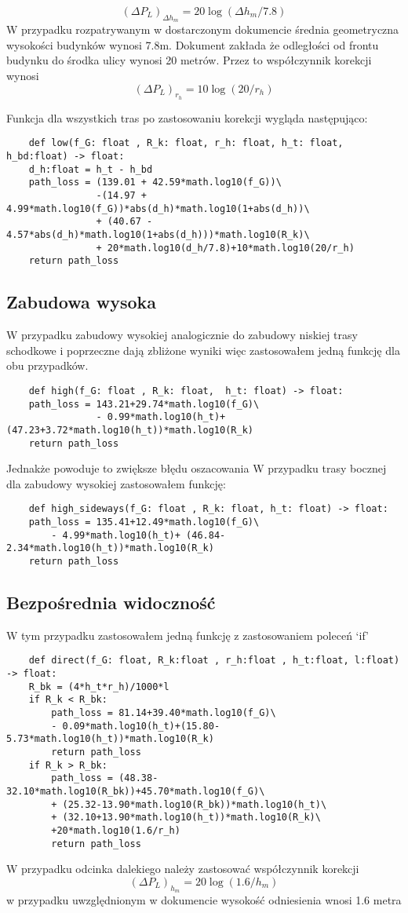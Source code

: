 \documentclass{article}
\begin{document}
\[ {\left(\Delta P_L\right)}_{\Delta h_m} = 20\log{(\Delta h_m/7.8)} \]
W przypadku rozpatrywanym w dostarczonym dokumencie średnia geometryczna wysokości budynków wynosi 7.8m.
\newline
Dokument zakłada że odległości od frontu budynku do środka ulicy wynosi 20 metrów. Przez to współczynnik korekcji wynosi
\[ {\left(\Delta P_L\right)}_{r_h} = 10\log(20/r_h) \]

Funkcja dla wszystkich tras po zastosowaniu korekcji wygląda następująco:
\begin{verbatim}
    def low(f_G: float , R_k: float, r_h: float, h_t: float, h_bd:float) -> float:
    d_h:float = h_t - h_bd
    path_loss = (139.01 + 42.59*math.log10(f_G))\
                -(14.97 + 4.99*math.log10(f_G))*abs(d_h)*math.log10(1+abs(d_h))\
                + (40.67 - 4.57*abs(d_h)*math.log10(1+abs(d_h)))*math.log10(R_k)\
                + 20*math.log10(d_h/7.8)+10*math.log10(20/r_h)
    return path_loss
\end{verbatim}
\subsection{Zabudowa wysoka}
W przypadku zabudowy wysokiej analogicznie do zabudowy niskiej trasy schodkowe i poprzeczne dają zbliżone wyniki więc zastosowałem jedną funkcję dla obu przypadków.
\begin{verbatim}
    def high(f_G: float , R_k: float,  h_t: float) -> float:
    path_loss = 143.21+29.74*math.log10(f_G)\
                - 0.99*math.log10(h_t)+ (47.23+3.72*math.log10(h_t))*math.log10(R_k)
    return path_loss
\end{verbatim}
Jednakże powoduje to zwiększe błędu oszacowania
\newline
W przypadku trasy bocznej dla zabudowy wysokiej zastosowałem funkcję:
\begin{verbatim}
    def high_sideways(f_G: float , R_k: float, h_t: float) -> float:
    path_loss = 135.41+12.49*math.log10(f_G)\
        - 4.99*math.log10(h_t)+ (46.84-2.34*math.log10(h_t))*math.log10(R_k)
    return path_loss
\end{verbatim}
\subsection{Bezpośrednia widoczność}
W tym przypadku zastosowałem jedną funkcję z zastosowaniem poleceń `if'
\begin{verbatim}
    def direct(f_G: float, R_k:float , r_h:float , h_t:float, l:float) -> float:
    R_bk = (4*h_t*r_h)/1000*l
    if R_k < R_bk:
        path_loss = 81.14+39.40*math.log10(f_G)\
        - 0.09*math.log10(h_t)+(15.80-5.73*math.log10(h_t))*math.log10(R_k)
        return path_loss
    if R_k > R_bk:
        path_loss = (48.38-32.10*math.log10(R_bk))+45.70*math.log10(f_G)\
        + (25.32-13.90*math.log10(R_bk))*math.log10(h_t)\
        + (32.10+13.90*math.log10(h_t))*math.log10(R_k)\
        +20*math.log10(1.6/r_h)
        return path_loss
\end{verbatim}
W przypadku odcinka dalekiego należy zastosować współczynnik korekcji 
\[ {\left(\Delta P_L\right)}_{ h_m} = 20\log{(1.6/h_m)} \]
w przypadku uwzględnionym w dokumencie wysokość odniesienia wnosi 1.6 metra
\end{document}
